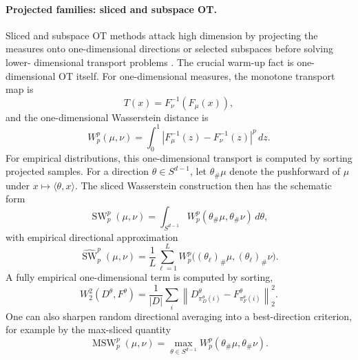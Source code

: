 \paragraph{Projected families: sliced and subspace OT.}
Sliced and subspace OT methods attack high dimension by projecting the measures
onto one-dimensional directions or selected subspaces before solving lower-
dimensional transport problems
\citep{kolouri2019generalized,deshpande2019maxsliced,paty2019subspace,nguyen2025sliced}.
The crucial warm-up fact is one-dimensional OT itself.  For one-dimensional
measures, the monotone transport map is
\begin{equation}
\label{eq:bf-neural-ot-dynamic-monotone-map}
  T(x)=F_\nu^{-1}(F_\mu(x)),
\end{equation}
and the one-dimensional Wasserstein distance is
\begin{equation}
\label{eq:bf-neural-ot-dynamic-oned-wasserstein}
  W_p^p(\mu,\nu)
  =
  \int_0^1
  \left|F_\mu^{-1}(z)-F_\nu^{-1}(z)\right|^p\,dz.
\end{equation}
For empirical distributions, this one-dimensional transport is computed by sorting
projected samples.  For a direction \(\theta\in S^{d-1}\), let \(\theta_\#\mu\)
denote the pushforward of \(\mu\) under \(x\mapsto\langle\theta,x\rangle\).  The
sliced Wasserstein construction then has the schematic form
\begin{equation}
\label{eq:bf-neural-ot-dynamic-sliced}
  \operatorname{SW}_p^p(\mu,\nu)
  =
  \int_{S^{d-1}} W_p^p(\theta_\#\mu,\theta_\#\nu)\,d\theta,
\end{equation}
with empirical directional approximation
\begin{equation}
\label{eq:bf-neural-ot-dynamic-sliced-empirical}
  \widehat{\operatorname{SW}}_p^p(\mu,\nu)
  =
  \frac{1}{L}\sum_{\ell=1}^L
  W_p^p\bigl((\theta_\ell)_\#\mu,(\theta_\ell)_\#\nu\bigr).
\end{equation}
A fully empirical one-dimensional term is computed by sorting,
\begin{equation}
\label{eq:bf-neural-ot-dynamic-sliced-sorting}
  W_2^2(D^\theta,F^\theta)
  =
  \frac{1}{|D|}\sum_i
  \left\|D^\theta_{\pi_D^\theta(i)}-F^\theta_{\pi_F^\theta(i)}\right\|_2^2.
\end{equation}
One can also sharpen random directional averaging into a best-direction criterion,
for example by the max-sliced quantity
\begin{equation}
\label{eq:bf-neural-ot-dynamic-max-sliced}
  \operatorname{MSW}_p^p(\mu,\nu)
  =
  \max_{\theta\in S^{d-1}}W_p^p(\theta_\#\mu,\theta_\#\nu).
\end{equation}
